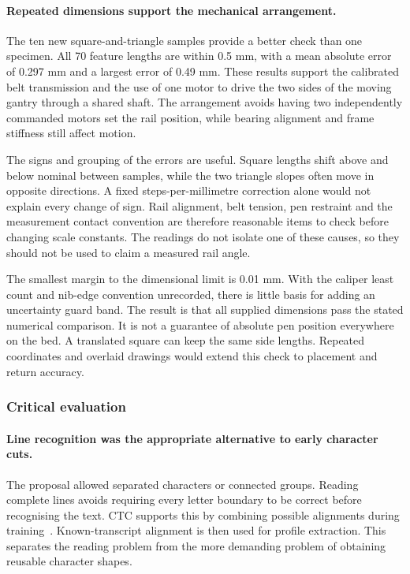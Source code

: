 \paragraph{Repeated dimensions support the mechanical arrangement.}
The ten new square-and-triangle samples provide a better check than one specimen. All 70 feature lengths are within 0.5 mm, with a mean absolute error of 0.297 mm and a largest error of 0.49 mm. These results support the calibrated belt transmission and the use of one motor to drive the two sides of the moving gantry through a shared shaft. The arrangement avoids having two independently commanded motors set the rail position, while bearing alignment and frame stiffness still affect motion.

The signs and grouping of the errors are useful. Square lengths shift above and below nominal between samples, while the two triangle slopes often move in opposite directions. A fixed steps-per-millimetre correction alone would not explain every change of sign. Rail alignment, belt tension, pen restraint and the measurement contact convention are therefore reasonable items to check before changing scale constants. The readings do not isolate one of these causes, so they should not be used to claim a measured rail angle.

The smallest margin to the dimensional limit is 0.01 mm. With the caliper least count and nib-edge convention unrecorded, there is little basis for adding an uncertainty guard band. The result is that all supplied dimensions pass the stated numerical comparison. It is not a guarantee of absolute pen position everywhere on the bed. A translated square can keep the same side lengths. Repeated coordinates and overlaid drawings would extend this check to placement and return accuracy.

\subsubsection{Critical evaluation}
\label{sec:dis-choices}
\paragraph{Line recognition was the appropriate alternative to early character cuts.}
The proposal allowed separated characters or connected groups. Reading complete lines avoids requiring every letter boundary to be correct before recognising the text. CTC supports this by combining possible alignments during training~\cite[pp.~2--3]{graves2006}. Known-transcript alignment is then used for profile extraction. This separates the reading problem from the more demanding problem of obtaining reusable character shapes.

